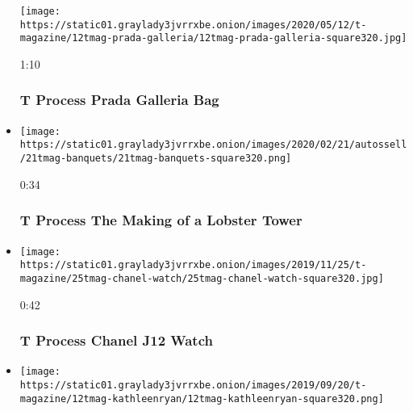 \begin{itemize}
  \texttt{[image: https://static01.graylady3jvrrxbe.onion/images/2020/05/12/t-magazine/12tmag-prada-galleria/12tmag-prada-galleria-square320.jpg]}

  1:10

  \hypertarget{t-process--prada-galleria-bag}{%
  \subsubsection{T Process \textbar{} Prada Galleria
  Bag}\label{t-process--prada-galleria-bag}}
\item
  \href{https://www.nytimes3xbfgragh.onion/video/t-magazine/100000006981030/t-process-the-making-of-a-lobster-tower.html?action=click\&module=video-series-bar\&region=header\&pgtype=Article\&playlistId=video/t-process}{}

  \texttt{[image: https://static01.graylady3jvrrxbe.onion/images/2020/02/21/autossell/21tmag-banquets/21tmag-banquets-square320.png]}

  0:34

  \hypertarget{t-process--the-making-of-a-lobster-tower}{%
  \subsubsection{T Process \textbar{} The Making of a Lobster
  Tower}\label{t-process--the-making-of-a-lobster-tower}}
\item
  \href{https://www.nytimes3xbfgragh.onion/video/t-magazine/100000006834800/t-process-chanel-j12-watch.html?action=click\&module=video-series-bar\&region=header\&pgtype=Article\&playlistId=video/t-process}{}

  \texttt{[image: https://static01.graylady3jvrrxbe.onion/images/2019/11/25/t-magazine/25tmag-chanel-watch/25tmag-chanel-watch-square320.jpg]}

  0:42

  \hypertarget{t-process--chanel-j12-watch}{%
  \subsubsection{T Process \textbar{} Chanel J12
  Watch}\label{t-process--chanel-j12-watch}}
\item
  \href{https://www.nytimes3xbfgragh.onion/video/t-magazine/100000006716047/t-process-the-making-of-a-giant-bejeweled-lemon.html?action=click\&module=video-series-bar\&region=header\&pgtype=Article\&playlistId=video/t-process}{}

  \texttt{[image: https://static01.graylady3jvrrxbe.onion/images/2019/09/20/t-magazine/12tmag-kathleenryan/12tmag-kathleenryan-square320.png]}


\end{itemize}
